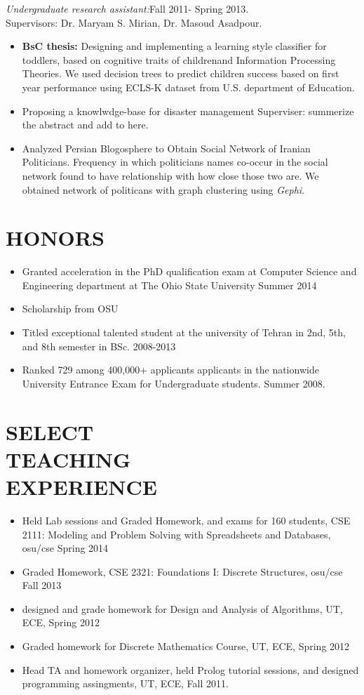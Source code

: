 \documentclass[margin, 10pt]{res}
\begin{document}
\begin{resume}
\textit{Undergraduate research assistant:}\hfill Fall 2011- Spring 2013. \\
Supervisors: Dr. Maryam S. Mirian, Dr. Masoud Asadpour.\\
\begin{itemize}
\item \textbf{BsC thesis:} Designing and implementing a learning style classifier for toddlers, based on cognitive traits of childrenand Information Processing Theories. We used decision trees to predict children success based on first year performance using ECLS-K dataset  from U.S. department of Education.
\item Proposing a knowlwdge-base for disaster management Superviser: summerize the abstract and add to here.

\item Analyzed Persian Blogosphere to Obtain Social Network of Iranian Politicians. 
Frequency in which politicians names co-occur in the social network found to have relationship with how close those two are. We obtained network of politicans with graph clustering using \textit{Gephi}.
\end{itemize}


\section{HONORS}
\begin{itemize}
\item Granted acceleration in the PhD qualification exam at Computer Science and Engineering department at The Ohio State University \hfill Summer 2014
\item Scholarship from OSU
\item Titled exceptional talented student at the university of Tehran in 2nd, 5th, and 8th semester in BSc. \hfill 2008-2013
\item Ranked 729 among 400,000+ applicants applicants in the nationwide University
Entrance Exam for Undergraduate students. \hfill Summer 2008.
\end{itemize}

\section{SELECT \\ TEACHING \\ EXPERIENCE}
\begin{itemize}
\item Held Lab sessions and Graded Homework, and exams for 160 students, CSE 2111: Modeling and Problem Solving with Spreadsheets and Databases, osu/cse Spring 2014
\item Graded Homework, CSE 2321: Foundations I: Discrete Structures, osu/cse Fall 2013
\item designed and grade homework for Design and Analysis of Algorithms, UT, ECE, Spring 2012
\item Graded homework for  Discrete Mathematics Course, UT, ECE, Spring 2012
\item Head TA and homework organizer, held Prolog tutorial sessions, and designed programming assingments, UT, ECE, Fall 2011.


\end{itemize}
\end{resume}
\end{document}
